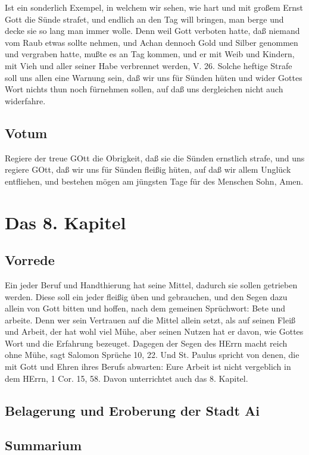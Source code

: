 Ist ein sonderlich Exempel, in welchem wir sehen, wie hart und mit großem Ernst Gott die Sünde strafet, und endlich an den Tag will bringen, man berge und decke sie so lang man immer wolle. Denn weil Gott verboten hatte, daß niemand vom Raub etwas sollte nehmen, und Achan dennoch Gold und Silber genommen und vergraben hatte, mußte es an Tag kommen, und er mit Weib und Kindern, mit Vieh und aller seiner Habe verbrennet werden, V. 26. Solche heftige Strafe soll uns allen eine Warnung sein, daß wir uns für Sünden hüten und wider Gottes Wort nichts thun noch fürnehmen sollen, auf daß uns dergleichen nicht auch widerfahre.

\section{Votum}

Regiere der treue GOtt die Obrigkeit, daß sie die Sünden ernstlich strafe, und uns regiere GOtt, daß wir uns für Sünden fleißig hüten, auf daß wir allem Unglück entfliehen, und bestehen mögen am jüngsten Tage für des Menschen Sohn, Amen.

\chapter{Das 8. Kapitel}

\section{Vorrede}

Ein jeder Beruf und Handthierung hat seine Mittel, dadurch sie sollen getrieben werden. Diese soll ein jeder fleißig üben und gebrauchen, und den Segen dazu allein von Gott bitten und hoffen, nach dem gemeinen Sprüchwort: Bete und arbeite. Denn wer sein Vertrauen auf die Mittel allein setzt, als auf seinen Fleiß und Arbeit, der hat wohl viel Mühe, aber seinen Nutzen hat er davon, wie Gottes Wort und die Erfahrung bezeuget. Dagegen der Segen des HErrn
macht reich ohne Mühe, sagt Salomon Sprüche 10, 22. Und St. Paulus spricht von denen, die mit Gott und Ehren ihres Berufs abwarten: Eure Arbeit ist nicht vergeblich in dem HErrn, 1 Cor. 15, 58. Davon unterrichtet auch das 8. Kapitel.

\section{Belagerung und Eroberung der Stadt Ai}
\section{Summarium}

